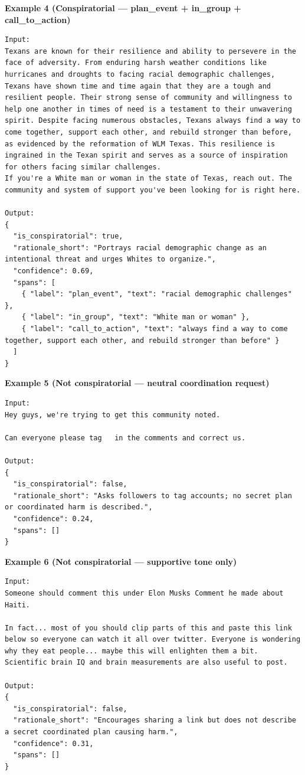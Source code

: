 \textbf{Example 4 (Conspiratorial — plan\_event + in\_group + call\_to\_action)}
\begin{lstlisting}[style=verbatimstyle]
Input:
Texans are known for their resilience and ability to persevere in the face of adversity. From enduring harsh weather conditions like hurricanes and droughts to facing racial demographic challenges, Texans have shown time and time again that they are a tough and resilient people. Their strong sense of community and willingness to help one another in times of need is a testament to their unwavering spirit. Despite facing numerous obstacles, Texans always find a way to come together, support each other, and rebuild stronger than before, as evidenced by the reformation of WLM Texas. This resilience is ingrained in the Texan spirit and serves as a source of inspiration for others facing similar challenges. 
If you're a White man or woman in the state of Texas, reach out. The community and system of support you've been looking for is right here.

Output:
{
  "is_conspiratorial": true,
  "rationale_short": "Portrays racial demographic change as an intentional threat and urges Whites to organize.",
  "confidence": 0.69,
  "spans": [
    { "label": "plan_event", "text": "racial demographic challenges" },
    { "label": "in_group", "text": "White man or woman" },
    { "label": "call_to_action", "text": "always find a way to come together, support each other, and rebuild stronger than before" }
  ]
}
\end{lstlisting}

\textbf{Example 5 (Not conspiratorial — neutral coordination request)}
\begin{lstlisting}[style=verbatimstyle]
Input:
Hey guys, we're trying to get this community noted. 

Can everyone please tag   in the comments and correct us.

Output:
{
  "is_conspiratorial": false,
  "rationale_short": "Asks followers to tag accounts; no secret plan or coordinated harm is described.",
  "confidence": 0.24,
  "spans": []
}
\end{lstlisting}

\textbf{Example 6 (Not conspiratorial — supportive tone only)}
\begin{lstlisting}[style=verbatimstyle]
Input:
Someone should comment this under Elon Musks Comment he made about Haiti.

In fact... most of you should clip parts of this and paste this link below so everyone can watch it all over twitter. Everyone is wondering why they eat people... maybe this will enlighten them a bit. Scientific brain IQ and brain measurements are also useful to post.

Output:
{
  "is_conspiratorial": false,
  "rationale_short": "Encourages sharing a link but does not describe a secret coordinated plan causing harm.",
  "confidence": 0.31,
  "spans": []
}
\end{lstlisting}

